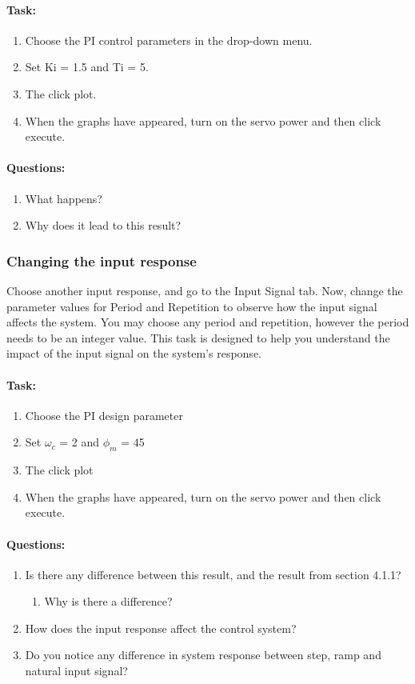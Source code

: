 \paragraph{Task: }
\begin{enumerate}[]
	\item Choose the PI control parameters in the drop-down menu.
	\item Set  Ki = 1.5 and Ti = 5.
	\item The click plot.
	\item When the graphs have appeared, turn on the servo power and then click execute. 
\end{enumerate}

\paragraph{Questions:}
\begin{enumerate}[]
	\item What happens?
	\item Why does it lead to this result?
\end{enumerate}



\subsubsection{Changing the input response} 
Choose another input response, and go to the Input Signal tab. Now, change the parameter values for Period and Repetition to observe how the input signal affects the system. You may choose any period and repetition, however the period needs to be an integer value. This task is designed to help you understand the impact of the input signal on the system’s response.
\paragraph{Task:}
\begin{enumerate}[]
	\item Choose the PI design parameter
	\item Set $\omega_c$ = 2 and $\phi_m$ = 45
	\item The click plot
	\item When the graphs have appeared, turn on the servo power and then click execute.
\end{enumerate}
\paragraph{Questions:}
\begin{enumerate}[]
	\item Is there any difference between this result, and the result from section 4.1.1?
	\begin{enumerate}
	\item Why is there a difference?
	\end{enumerate}
	\item How does the input response affect the control system?
	\item Do you notice any difference in system response between step, ramp and natural input signal?
\end{enumerate}

